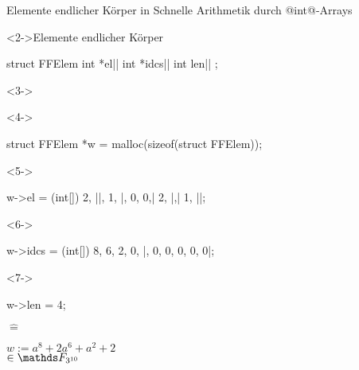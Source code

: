 \documentclass{vorlage}
\begin{document}
\begin{frame}[fragile]{Elemente endlicher Körper in \Clang}
   Schnelle Arithmetik durch @int@-Arrays
  \begin{block}<2->{Elemente endlicher Körper}
  \lstnospace
  \begin{cexample}
struct FFElem{
    int *el||
    int *idcs||
    int len||
};
  \end{cexample}
  \end{block}
  \begin{beispiel}<3->
  \lstnospace
  \begin{minipage}{0.68\textwidth}
  \begin{uncoverenv}<4->\begin{cexample}
struct FFElem *w = malloc(sizeof(struct FFElem));
  \end{cexample}\end{uncoverenv}\lstnospace
  \begin{uncoverenv}<5->\begin{cexample}
w->el = (int[]) {2, ||, 1, |, 0, 0,| 2, |,| 1, ||};
  \end{cexample}\end{uncoverenv}\lstnospace
  \begin{uncoverenv}<6->\begin{cexample}
w->idcs = (int[]) {8, 6, 2, 0, |, 0, 0, 0, 0, 0|};
  \end{cexample}\end{uncoverenv}\lstnospace
  \begin{uncoverenv}<7->\begin{cexample}
w->len = 4;
  \end{cexample}\end{uncoverenv}
  \end{minipage}$\hat=$\quad
  \begin{minipage}{0.24\textwidth}
  $w := a^8+2a^6+a^2+2$\\
  $\in\F_{3^{10}}$
  \end{minipage}
  \end{beispiel}
\end{frame}
\end{document}

